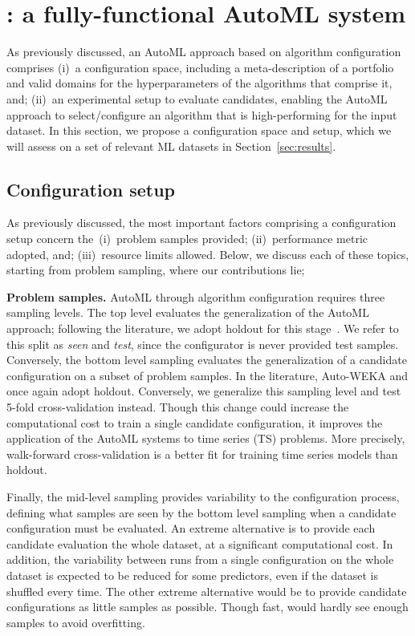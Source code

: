 \section{\isklearn: a fully-functional AutoML system}
\label{sec:isklearn}

As previously discussed, an AutoML approach based on algorithm configuration comprises (i)~a configuration space, including a meta-description of a portfolio and valid domains for the hyperparameters of the algorithms that comprise it, and; (ii)~an experimental setup to evaluate candidates, enabling the AutoML approach to select/configure an algorithm that is high-performing for the input dataset. In this section, we propose a configuration space and setup, which we will assess on a set of relevant ML datasets in Section~\ref{sec:results}.


%
%

\subsection{Configuration setup}
\label{sec:config-setup}

As previously discussed, the most important factors comprising a configuration setup concern the~(i)~problem samples provided; (ii)~performance metric adopted, and; (iii)~resource limits allowed. Below, we discuss each of these topics, starting from problem sampling, where our contributions lie;

\textbf{Problem samples.} AutoML through algorithm configuration requires three sampling levels. The top level evaluates the generalization of the AutoML approach; following the literature, we adopt holdout for this stage~\cite{autoweka,auto-sklearn}. We refer to this split as \emph{seen} and \emph{test}, since the configurator is never provided test samples. Conversely, the bottom level sampling evaluates the generalization of a candidate configuration on a subset of problem samples. In the literature, Auto-WEKA and \autosklearn once again adopt holdout. Conversely, we generalize this sampling level and test 5-fold cross-validation instead. Though this change could increase the computational cost to train a single candidate configuration, it improves the application of the AutoML systems to time series (TS) problems. More precisely, walk-forward cross-validation is a better fit for training time series models than holdout.

Finally, the mid-level sampling provides variability to the configuration process, defining what samples are seen by the bottom level sampling when a candidate configuration must be evaluated. An extreme alternative is to provide each candidate evaluation the whole dataset, at a significant computational cost. In addition, the variability between runs from a single configuration on the whole dataset is expected to be reduced for some predictors, even if the dataset is shuffled every time. The other extreme alternative would be to provide candidate configurations as little samples as possible. %
Though fast, \irace would hardly see enough samples to avoid overfitting. %

